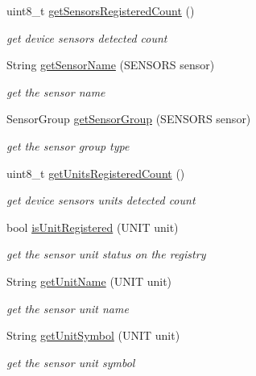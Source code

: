 \begin{DoxyCompactItemize}
uint8\+\_\+t \hyperlink{classSensors_ad8395e69cf5dcc68d0a8049ec7372a81}{get\+Sensors\+Registered\+Count} ()
\begin{DoxyCompactList}\small\item\em get device sensors detected count \end{DoxyCompactList}\item 
String \hyperlink{classSensors_aa7ca70f31838cba52b96f76aa4a0d4a2}{get\+Sensor\+Name} (S\+E\+N\+S\+O\+RS sensor)
\begin{DoxyCompactList}\small\item\em get the sensor name \end{DoxyCompactList}\item 
Sensor\+Group \hyperlink{classSensors_abd4b900acd33f41c7fd184e0dad90aeb}{get\+Sensor\+Group} (S\+E\+N\+S\+O\+RS sensor)
\begin{DoxyCompactList}\small\item\em get the sensor group type \end{DoxyCompactList}\item 
\mbox{\label{classSensors_a1d723cdb619b2d61d3e4080182a12cbb}} 
uint8\+\_\+t \hyperlink{classSensors_a1d723cdb619b2d61d3e4080182a12cbb}{get\+Units\+Registered\+Count} ()
\begin{DoxyCompactList}\small\item\em get device sensors units detected count \end{DoxyCompactList}\item 
bool \hyperlink{classSensors_ac1acd7bf32bda39fdfde1753af3ceef2}{is\+Unit\+Registered} (U\+N\+IT unit)
\begin{DoxyCompactList}\small\item\em get the sensor unit status on the registry \end{DoxyCompactList}\item 
String \hyperlink{classSensors_a4abb5d2a00d31a407e32cbdabe00b6eb}{get\+Unit\+Name} (U\+N\+IT unit)
\begin{DoxyCompactList}\small\item\em get the sensor unit name \end{DoxyCompactList}\item 
String \hyperlink{classSensors_a365a45dc5c9ab598cfc206368579b94a}{get\+Unit\+Symbol} (U\+N\+IT unit)
\begin{DoxyCompactList}\small\item\em get the sensor unit symbol \end{DoxyCompactList}\item 

\end{DoxyCompactItemize}
